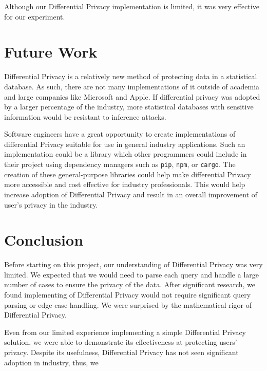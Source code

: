 \documentclass[conference,11pt]{IEEEtran}
\begin{document}
Although our Differential Privacy implementation is limited, it was very
effective for our experiment.

\section{Future Work}\label{sec:future-work}
Differential Privacy is a relatively new method of protecting data in a
statistical database. As such, there are not many implementations of it outside
of academia and large companies like Microsoft and Apple. If differential
privacy was adopted by a larger percentage of the industry, more statistical
databases with sensitive information would be resistant to inference attacks.

Software engineers have a great opportunity to create implementations of
differential Privacy suitable for use in general industry applications. Such an
implementation could be a library which other programmers could include in their
project using dependency managers such as \texttt{pip}, \texttt{npm}, or
\texttt{cargo}. The creation of these general-purpose libraries could help make
differential Privacy more accessible and cost effective for industry
professionals. This would help increase adoption of Differential Privacy and
result in an overall improvement of user's privacy in the industry.

\section{Conclusion}\label{sec:conclusion}
Before starting on this project, our understanding of Differential Privacy was
very limited. We expected that we would need to parse each query and handle a
large number of cases to ensure the privacy of the data.
After significant research, we found implementing of Differential Privacy would
not require significant query parsing or edge-case handling. We were surprised
by the mathematical rigor of Differential Privacy.

Even from our limited experience implementing a simple Differential Privacy
solution, we were able to demonstrate its effectiveness at protecting users'
privacy. Despite its usefulness, Differential Privacy has not seen significant
adoption in industry, thus, we %

{\printbibliography}
\end{document}
